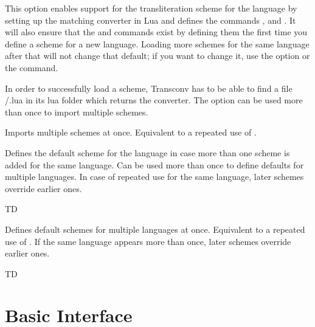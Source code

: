 \documentclass{ltxdockit}
\begin{document}
\begin{optionlist}

  This option enables support for the transliteration scheme  for
  the language  by setting up the matching converter in Lua and
  defines the commands ,
   and
  . It will also ensure that the
   and 
  commands exist by defining them the first time you define a scheme for a new
  language. Loading more schemes for the same language after that will not
  change that default; if you want to change it, use the 
  option or the  command.

  In order to successfully load a scheme, Transconv has to be able to find
  a file /.lua in its lua folder which returns the
  converter. The option can be used more than once to import multiple schemes.


  Imports multiple schemes at once. Equivalent to a repeated use of
  .


  Defines the default scheme for the language  in case more than one
  scheme is added for the same language. Can be used more than once to define
  defaults for multiple languages. In case of repeated use for the same
  language, later schemes override earlier ones.

  TD


  Defines default schemes for multiple languages at once. Equivalent to a
  repeated use of . If the same language appears more than
  once, later schemes override earlier ones.

  TD

\end{optionlist}

\section{Basic Interface}
\end{document}

